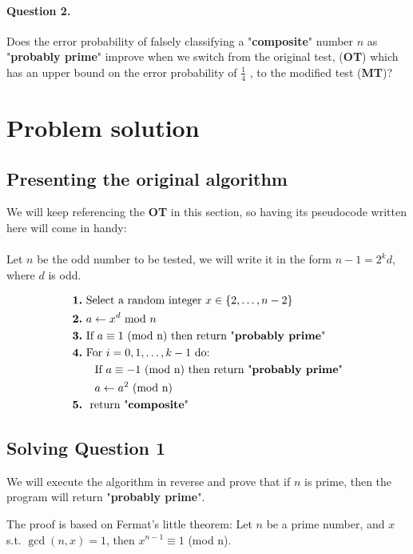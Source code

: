 \documentclass[11pt]{llncs}
\begin{document}
\paragraph{\textbf{Question 2.}} Does the error probability of falsely classifying a "\textbf{composite}" number $n$ as "\textbf{probably prime}" improve when we switch from the original test, (\textbf{OT}) which has an upper bound on the error probability of $\frac{1}{4}$ \cite{rabin}, to the modified test (\textbf{MT})?

\section{Problem solution}

\subsection{Presenting the original algorithm}
We will keep referencing the \textbf{OT} in this section, so having its pseudocode written here will come in handy: \\ \\
Let $n$ be the odd number to be tested, we will write it in the form $n - 1 = 2^kd$, where $d$ is odd. 

\[ \begin{aligned}
& \textbf{1.}\ \text{Select a random integer } x \in \{2,\dots,n-2\} \\
& \textbf{2.}\ a \leftarrow x^d \text{ mod } n \\
& \textbf{3.}\ \text{If } a \equiv 1 \text{ (mod n)} \text{ then return "\textbf{probably prime}"}\\
& \textbf{4.}\ \text{For } i = 0,1,\dots,k-1 \text{ do:}\\
& \quad \quad \text{If } a \equiv - 1 \text{ (mod n) then return "\textbf{probably prime}"} \\
& \quad \quad a \leftarrow a^2 \text{ (mod n)} \\
& \textbf{5.}\ \text{ return "\textbf{composite}"}
\end{aligned} \]

\subsection{Solving Question 1}
We will execute the algorithm in reverse and prove that if $n$ is prime, then the program will return "\textbf{probably prime}".

The proof is based on Fermat's little theorem: Let $n$ be a prime number, and $x$ s.t. $\gcd(n, x) = 1$, then $x^{n-1} \equiv 1$ (mod n).
\end{document}

